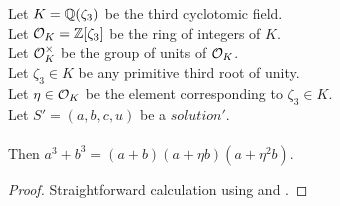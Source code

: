 \begin{lemma}
    \label{lmm:cube_add_cube_eq_mul}
    \leanok
    Let $K = \mathbb{Q}(\zeta_3)$ be the third cyclotomic field. \\
    Let $\mathcal{O}_K = \mathbb{Z}[\zeta_3]$ be the ring of integers of $K$. \\
    Let $\mathcal{O}^\times_K$ be the group of units of $\mathcal{O}_K$. \\
    Let $\zeta_3 \in K$ be any primitive third root of unity. \\
    Let $\eta \in \mathcal{O}_K$ be the element corresponding to $\zeta_3 \in K$. \\
    Let $S'=(a, b, c, u)$ be a $solution'$.\\\\
    Then $a^3 + b^3 = (a + b) (a + \eta b) (a + \eta^2 b)$.
\end{lemma}
\begin{proof}
    \leanok
    Straightforward calculation using 
    and .
\end{proof}


